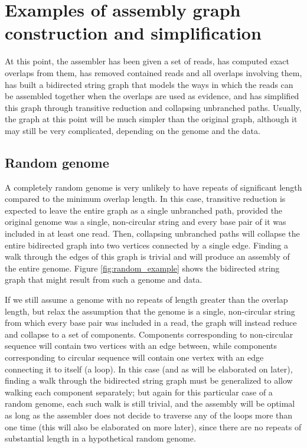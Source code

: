 \documentclass[12pt]{article}
\newcommand{\Figure}[1]{Figure \ref{#1}}
\begin{document}
\section{Examples of assembly graph construction and simplification}

At this point, the assembler has been given a set of reads, has computed exact
overlaps from them, has removed contained reads and all overlaps involving them,
has built a bidirected string graph that models the ways in which the reads can
be assembled together when the overlaps are used as evidence, and has simplified
this graph through transitive reduction and collapsing unbranched paths.
Usually, the graph at this point will be much simpler than the original graph,
although it may still be very complicated, depending on the genome and the data.

\subsection{Random genome}

A completely random genome is very unlikely to have repeats of significant
length compared to the minimum overlap length.  In this case, transitive
reduction is expected to leave the entire graph as a single unbranched path,
provided the original genome was a single, non-circular string and every base
pair of it was included in at least one read.  Then, collapsing unbranched paths
will collapse the entire bidirected graph into two vertices connected by a
single edge.  Finding a walk through the edges of this graph is trivial and will
produce an assembly of the entire genome.  \Figure{fig:random_example} shows the
bidirected string graph that might result from such a genome and data.

If we still assume a genome with no repeats of length greater than the overlap
length, but relax the assumption that the genome is a single, non-circular
string from which every base pair was included in a read, the graph will instead
reduce and collapse to a set of components.  Components corresponding to
non-circular sequence will contain two vertices with an edge between, while
components corresponding to circular sequence will contain one vertex with an
edge connecting it to itself (a loop).  In this case (and as will be elaborated
on later), finding a walk through the bidirected string graph must be
generalized to allow walking each component separately; but again for this
particular case of a random genome, each such walk is still trivial, and the
assembly will be optimal as long as the assembler does not decide to traverse
any of the loops more than one time (this will also be elaborated on more
later), since there are no repeats of substantial length in a hypothetical
random genome.
\end{document}
